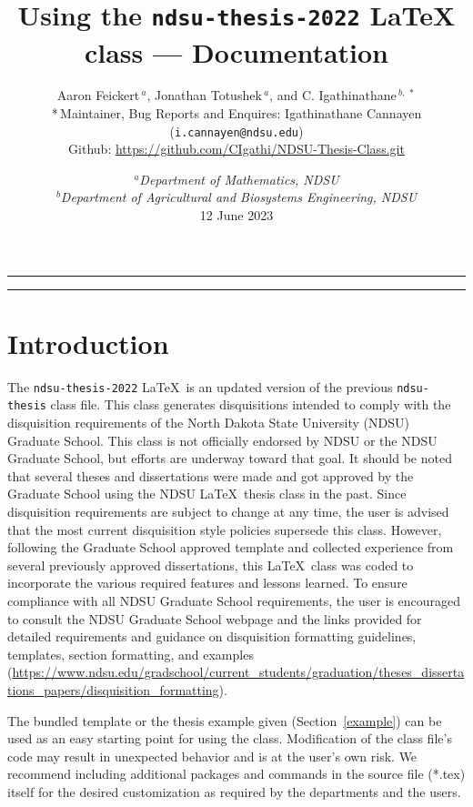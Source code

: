 \documentclass{article}
\title{\vspace{-1.5cm}Using the \texttt{ndsu-thesis-2022} \LaTeX\/ class --- Documentation}
\author{Aaron Feickert$\,^{a}$, Jonathan Totushek$\,^{a}$, and C. Igathinathane$\,^{b,\,*}$ \\ *\,Maintainer, Bug Reports and Enquires:  Igathinathane Cannayen (\texttt{i.cannayen@ndsu.edu})\\ {\small Github: \url{https://github.com/CIgathi/NDSU-Thesis-Class.git}}
}
\date{{\small $^{a}$\emph{Department of Mathematics, NDSU} \\ $^{b}$\emph{Department of Agricultural and Biosystems Engineering, NDSU}\\[2ex]}
12 June 2023}
\newcommand\ix[1]{#1\index{#1}} %
\begin{document}
\maketitle

\vspace{-2ex}
\hrule
\begin{multicols}{2}
\scriptsize
\tableofcontents
\end{multicols}
\hrule

\section{Introduction}
The \texttt{ndsu-thesis-2022} \LaTeX\ is an updated version of the previous \texttt{ndsu-thesis} \ix{class} file. This class generates disquisitions intended to comply with the disquisition requirements of the North Dakota State University (NDSU) Graduate School. This class is not officially endorsed by NDSU or the NDSU Graduate School, but efforts are underway toward that goal. It should be noted that several theses and dissertations were made and got approved by the Graduate School using the NDSU \LaTeX\ thesis class in the past. Since disquisition requirements are subject to change at any time, the user is advised that the most current disquisition style policies supersede this class. However, following the Graduate School approved template and collected experience from several previously approved dissertations, this \LaTeX\ class was coded to incorporate the various required features and lessons learned. To ensure compliance with all NDSU Graduate School requirements, the user is encouraged to consult the NDSU Graduate School webpage and the links provided for detailed requirements and guidance on disquisition formatting guidelines, templates, section formatting, and examples (\url{https://www.ndsu.edu/gradschool/current_students/graduation/theses_dissertations_papers/disquisition_formatting}).

The bundled \ix{template} or the thesis example given (Section~\ref{example}) can be used as an easy starting point for using the class. Modification of the class file's code may result in unexpected behavior and is at the user's own risk. We recommend including additional packages and commands in the source file (*.tex) itself for the desired customization as required by the departments and the users. 
\end{document}
